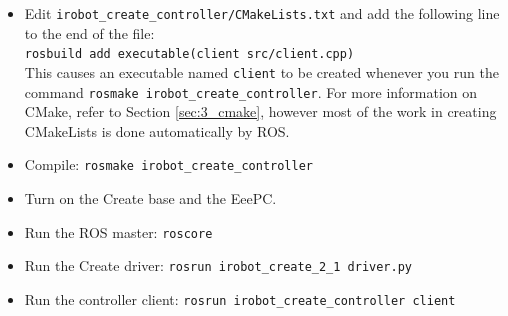 \begin{itemize}
\begin{verbatim}
  while(!endnow)
    {
      double forward = 0.0;
      double rotate = 0.3;

      // Create and publish a Twist message
      geometry_msgs::Twist twist;
      twist.linear.x = forward; twist.linear.y = 0; twist.linear.z = 0;
      twist.angular.x = 0; twist.angular.y = 0; twist.angular.z = rotate;
      create_pub.publish(twist);

      ros::spinOnce();
    }

  // Stop the robot's movement
  geometry_msgs::Twist twist;
  twist.linear.x = 0; twist.linear.y = 0; twist.linear.z = 0;
  twist.angular.x = 0; twist.angular.y = 0; twist.angular.z = 0;
  create_pub.publish(twist);

  printf("Done.\n");
	
  return(0);
}
\end{verbatim}

The Create driver publishes a single message type, \texttt{SensorPacket.msg}, which exports all of the robot's sensory information. The message file exists in:\\ ros-1.0.0/pkg/irobot\_create\_2\_1/msg/SensorPacket.msg\\ 
For online documentation, visit the Brown ROS Create Driver \href{http://code.google.com/p/brown-ros-pkg/wiki/irobot\_create\_2\_1}{site}.

Additionally, use this \href{http://www.ros.org/wiki/ROS/Tutorials/WritingPublisherSubscriber(c\%2B\%2B)}{ROS tutorial} as a helpful resource for writing simple Publish and Subscriber nodes in C++.

\item Edit \texttt{irobot\_create\_controller/CMakeLists.txt} and add the following line to the end of the file:\\
\texttt{rosbuild add executable(client src/client.cpp)}\\
This causes an executable named \texttt{client} to be created whenever you run the command \texttt{rosmake irobot\_create\_controller}. For more information on CMake, refer to Section \ref{sec:3_cmake}, however most of the work in creating CMakeLists is done automatically by ROS.

\item Compile: \texttt{rosmake irobot\_create\_controller}

\item Turn on the Create base and the EeePC.

\item Run the ROS master: \texttt{roscore}

\item Run the Create driver: \texttt{rosrun irobot\_create\_2\_1 driver.py}

\item Run the controller client: \texttt{rosrun irobot\_create\_controller client}

\end{itemize}
 
